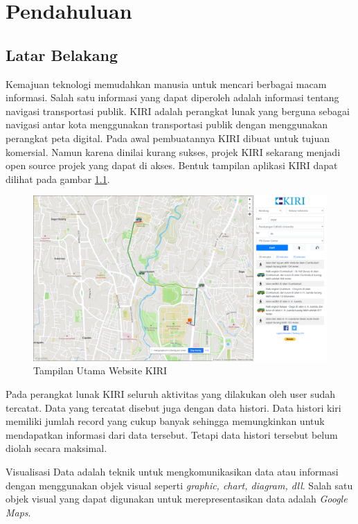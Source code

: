 \chapter{Pendahuluan}
\label{chap:intro}
   
\section{Latar Belakang}
\label{sec:label}

Kemajuan teknologi memudahkan manusia untuk mencari berbagai macam informasi. Salah satu informasi yang dapat diperoleh adalah informasi tentang navigasi transportasi publik. KIRI  adalah perangkat lunak yang berguna sebagai navigasi antar kota menggunakan transportasi publik dengan menggunakan perangkat peta digital\cite{pascal:17:KIRI}. Pada awal pembuatannya KIRI dibuat untuk tujuan komersial. Namun karena dinilai kurang sukses, projek KIRI sekarang menjadi open source projek yang dapat di akses. Bentuk tampilan aplikasi KIRI dapat dilihat pada gambar \ref{fig:kiri}.

\begin{figure}[H]
	\centering
	\includegraphics[scale=0.3]{Gambar/kiri-example-1.png}
	\caption{Tampilan Utama Website KIRI}
	\label{fig:kiri}
\end{figure}

Pada perangkat lunak KIRI seluruh aktivitas yang dilakukan oleh user sudah tercatat. Data yang tercatat disebut juga dengan data histori. Data histori kiri memiliki jumlah record yang cukup banyak sehingga memungkinkan untuk mendapatkan informasi dari data tersebut. Tetapi data histori tersebut belum diolah secara maksimal.

Visualisasi Data adalah teknik  untuk mengkomunikasikan data atau informasi dengan menggunakan objek visual  seperti \textit{graphic, chart, diagram, dll}. Salah satu objek visual yang dapat digunakan untuk merepresentasikan data adalah \textit{Google Maps}.

